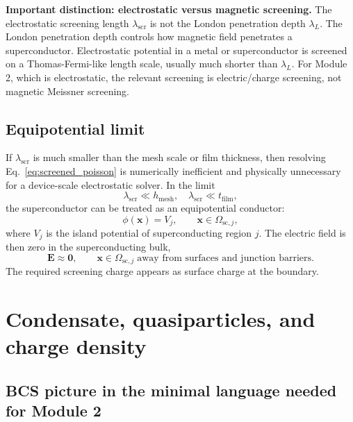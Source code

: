 \documentclass[11pt]{article}
\newcommand{\Evec}{\mathbf{E}}
\newcommand{\lams}{\lambda_{\mathrm{scr}}}
\newcommand{\lamL}{\lambda_{L}}
\begin{document}
\begin{physicsbox}
\textbf{Important distinction: electrostatic versus magnetic screening.} The electrostatic screening length $\lams$ is not the London penetration depth $\lamL$. The London penetration depth controls how magnetic field penetrates a superconductor. Electrostatic potential in a metal or superconductor is screened on a Thomas-Fermi-like length scale, usually much shorter than $\lamL$. For Module 2, which is electrostatic, the relevant screening is electric/charge screening, not magnetic Meissner screening.
\end{physicsbox}

\subsection{Equipotential limit}

If $\lams$ is much smaller than the mesh scale or film thickness, then resolving Eq.~\eqref{eq:screened_poisson} is numerically inefficient and physically unnecessary for a device-scale electrostatic solver. In the limit
\begin{equation}
\lams \ll h_{\mathrm{mesh}}, \quad \lams \ll t_{\mathrm{film}},
\end{equation}
the superconductor can be treated as an equipotential conductor:
\begin{equation}
\phi(\mathbf{x})=V_j, \qquad \mathbf{x}\in \Omega_{\mathrm{sc},j},
\label{eq:equipotential_sc}
\end{equation}
where $V_j$ is the island potential of superconducting region $j$. The electric field is then zero in the superconducting bulk,
\begin{equation}
\Evec\approx \mathbf{0}, \qquad \mathbf{x}\in \Omega_{\mathrm{sc},j}\;\text{away from surfaces and junction barriers}.
\end{equation}
The required screening charge appears as surface charge at the boundary.

\section{Condensate, quasiparticles, and charge density}

\subsection{BCS picture in the minimal language needed for Module 2}
\end{document}
